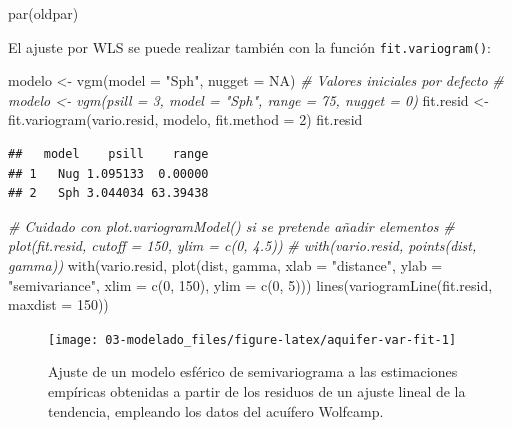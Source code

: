 \documentclass[
  spanish,
]{book}
\newenvironment{Shaded}{\begin{snugshade}}{\end{snugshade}}
\newcommand{\AttributeTok}[1]{\textcolor[rgb]{0.77,0.63,0.00}{#1}}
\newcommand{\CommentTok}[1]{\textcolor[rgb]{0.56,0.35,0.01}{\textit{#1}}}
\newcommand{\ConstantTok}[1]{\textcolor[rgb]{0.00,0.00,0.00}{#1}}
\newcommand{\DecValTok}[1]{\textcolor[rgb]{0.00,0.00,0.81}{#1}}
\newcommand{\FunctionTok}[1]{\textcolor[rgb]{0.00,0.00,0.00}{#1}}
\newcommand{\NormalTok}[1]{#1}
\newcommand{\OtherTok}[1]{\textcolor[rgb]{0.56,0.35,0.01}{#1}}
\newcommand{\StringTok}[1]{\textcolor[rgb]{0.31,0.60,0.02}{#1}}
\theoremstyle{break}
\theoremstyle{definition}
\theoremstyle{definition}
\theoremstyle{definition}
\theoremstyle{definition}
\theoremstyle{remark}
\begin{document}
\begin{Shaded}
\begin{Highlighting}[]
\FunctionTok{par}\NormalTok{(oldpar)}
\end{Highlighting}
\end{Shaded}

El ajuste por WLS se puede realizar también con la función \texttt{fit.variogram()}:

\begin{Shaded}
\begin{Highlighting}[]
\NormalTok{modelo }\OtherTok{\textless{}{-}} \FunctionTok{vgm}\NormalTok{(}\AttributeTok{model =} \StringTok{"Sph"}\NormalTok{, }\AttributeTok{nugget =} \ConstantTok{NA}\NormalTok{) }\CommentTok{\# Valores iniciales por defecto}
\CommentTok{\# modelo \textless{}{-} vgm(psill = 3, model = "Sph", range = 75, nugget = 0) }
\NormalTok{fit.resid }\OtherTok{\textless{}{-}} \FunctionTok{fit.variogram}\NormalTok{(vario.resid, modelo, }\AttributeTok{fit.method =} \DecValTok{2}\NormalTok{)}
\NormalTok{fit.resid}
\end{Highlighting}
\end{Shaded}

\begin{verbatim}
##   model    psill    range
## 1   Nug 1.095133  0.00000
## 2   Sph 3.044034 63.39438
\end{verbatim}

\begin{Shaded}
\begin{Highlighting}[]
\CommentTok{\# Cuidado con plot.variogramModel() si se pretende añadir elementos}
\CommentTok{\# plot(fit.resid, cutoff = 150, ylim = c(0, 4.5))}
\CommentTok{\# with(vario.resid,  points(dist, gamma))}
\FunctionTok{with}\NormalTok{(vario.resid, }\FunctionTok{plot}\NormalTok{(dist, gamma, }\AttributeTok{xlab =} \StringTok{"distance"}\NormalTok{, }\AttributeTok{ylab =}  \StringTok{"semivariance"}\NormalTok{, }
                       \AttributeTok{xlim =} \FunctionTok{c}\NormalTok{(}\DecValTok{0}\NormalTok{, }\DecValTok{150}\NormalTok{), }\AttributeTok{ylim =} \FunctionTok{c}\NormalTok{(}\DecValTok{0}\NormalTok{, }\DecValTok{5}\NormalTok{)))}
\FunctionTok{lines}\NormalTok{(}\FunctionTok{variogramLine}\NormalTok{(fit.resid, }\AttributeTok{maxdist =} \DecValTok{150}\NormalTok{))}
\end{Highlighting}
\end{Shaded}

\begin{figure}[!htb]

{\centering \texttt{[image: 03-modelado\_files/figure-latex/aquifer-var-fit-1]} 

}

\caption{Ajuste de un modelo esférico de semivariograma a las estimaciones empíricas obtenidas a partir de los residuos de un ajuste lineal de la tendencia, empleando los datos del acuífero Wolfcamp.}\label{fig:aquifer-var-fit}
\end{figure}
\end{document}
